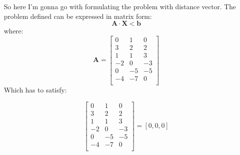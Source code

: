 \documentclass[12pt]{article}
\begin{document}
%
%
%
So here I'm gonna go with formulating the problem with distance
vector.
The problem defined can be expressed in matrix form: $$\pmb{A\cdot X < b }$$
 where:
\begin{equation}
 \pmb{A} =\begin{bmatrix}
 0 & 1  & 0  \\
 3 & 2  & 2  \\
 1 & 1 & 3 \\
-2 & 0 & -3 \\
0 & -5 & -5 \\
-4 & -7 & 0 \\

 \end{bmatrix}
\end{equation}
Which has to satisfy:

\begin{equation}
  [i_s, j_s, k_s, i_t, j_t, k_t] \begin{bmatrix}
 0 & 1  & 0  \\
 3 & 2  & 2  \\
 1 & 1 & 3 \\
-2 & 0 & -3 \\
0 & -5 & -5 \\
-4 & -7 & 0 \\

 \end{bmatrix}
= [0, 0, 0]
\end{equation}
\end{document}
